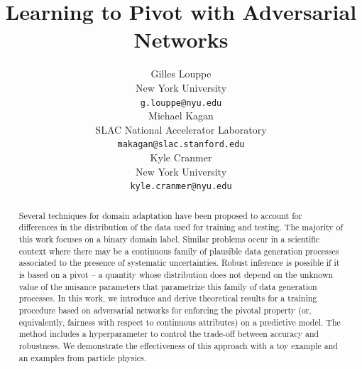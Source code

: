 \documentclass{article}
\title{Learning to Pivot with Adversarial Networks}
\author{
  Gilles Louppe\\
  New York University\\
  \texttt{g.louppe@nyu.edu}\\
  \And
  Michael Kagan\\
  SLAC National Accelerator Laboratory\\
  \texttt{makagan@slac.stanford.edu}\\
  \And
  Kyle Cranmer\\
  New York University\\
  \texttt{kyle.cranmer@nyu.edu}
}
\theoremstyle{plain}
\begin{document}

\maketitle

\begin{abstract}

Several techniques for domain adaptation have been proposed to account for
differences in the distribution of the data used for training and testing. The
majority of this work focuses on a binary domain label. Similar problems occur
in a scientific context where there may be a continuous family of plausible data
generation processes associated to the presence of systematic uncertainties.
Robust inference is possible if it is based on a pivot -- a quantity whose
distribution does not depend on the unknown value of the nuisance parameters
that parametrize this family of data generation processes. In this work,  we
introduce and derive theoretical results for a training procedure based on
adversarial networks for enforcing the pivotal property (or, equivalently,
fairness with respect to continuous attributes) on a predictive model. The
method includes a hyperparameter to control the trade-off between accuracy and
robustness. We demonstrate the effectiveness of this approach with a toy example
and an examples from particle physics.

\end{abstract}


\end{document}
